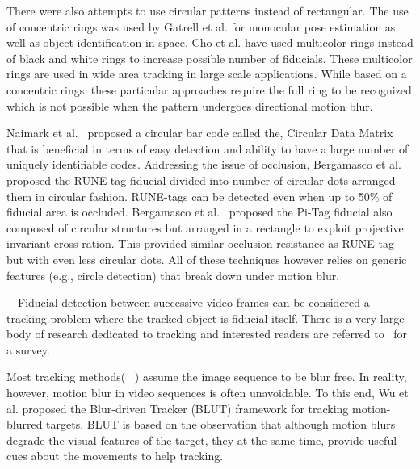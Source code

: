 \documentclass[runningheads]{llncs}
\begin{document}
There were also attempts to use circular patterns instead of rectangular. 
The use of concentric rings was used  by Gatrell et al.\cite{concentric}
for monocular pose estimation as well as object identification in space. Cho et al.
\cite{Cho:2001,Cho97fastcolor} have used multicolor rings instead of
black and white rings\cite{concentric} to increase possible number of fiducials.
These multicolor rings are used in wide area tracking in large scale
applications.  While based on a concentric rings, these particular approaches require 
the full ring to be recognized which is not possible when the pattern undergoes directional
motion blur.

Naimark et al.~\cite{NaimarkF02} proposed a circular bar code
called the, Circular Data Matrix that is beneficial in terms of
easy detection and ability to have a large number
of uniquely identifiable codes.  Addressing the issue of occlusion, 
Bergamasco et al. \cite{runetag11} proposed the RUNE-tag fiducial divided into number of
circular dots arranged them in circular fashion.
RUNE-tags can be detected even when up to 50\% of fiducial area is occluded.
Bergamasco et al.~\cite{Pitag13} proposed the Pi-Tag fiducial also composed 
of circular structures but arranged in a rectangle to exploit projective invariant cross-ration.
This provided similar occlusion resistance as RUNE-tag but with even less
circular dots. All of these techniques however relies on generic features
(e.g., circle detection) that break down under motion blur.


~~Fiducial detection between successive video
frames can be considered a tracking problem where the tracked object is fiducial itself.
There is a very large body of research dedicated to tracking and interested
readers are referred to~\cite{Yilmaz:2006} for a survey.

Most tracking methods(~\cite{Ross:2008,Wu:2009,Perez02,Mei:2009} ) assume the
image sequence to be blur free. In reality, however, motion blur in video
sequences is often unavoidable. To this end, Wu et al.\cite{Wu:2011} proposed the
Blur-driven Tracker (BLUT) framework for tracking motion-blurred targets. BLUT
is based on the observation that although motion blurs degrade the visual
features of the target, they at the same time, provide useful cues about the
movements to help tracking.
\end{document}
